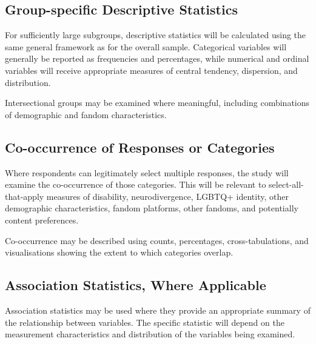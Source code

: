 
\subsection{Group-specific Descriptive Statistics}

For sufficiently large subgroups, descriptive statistics will be calculated using the same general framework as for the overall sample. Categorical variables will generally be reported as frequencies and percentages, while numerical and ordinal variables will receive appropriate measures of central tendency, dispersion, and distribution.

Intersectional groups may be examined where meaningful, including combinations of demographic and fandom characteristics.


\subsection{Co-occurrence of Responses or Categories}

Where respondents can legitimately select multiple responses, the study will examine the co-occurrence of those categories. This will be relevant to select-all-that-apply measures of disability, neurodivergence, LGBTQ+ identity, other demographic characteristics, fandom platforms, other fandoms, and potentially content preferences.

Co-occurrence may be described using counts, percentages, cross-tabulations, and visualisations showing the extent to which categories overlap.


\subsection{Association Statistics, Where Applicable}

Association statistics may be used where they provide an appropriate summary of the relationship between variables. The specific statistic will depend on the measurement characteristics and distribution of the variables being examined.

